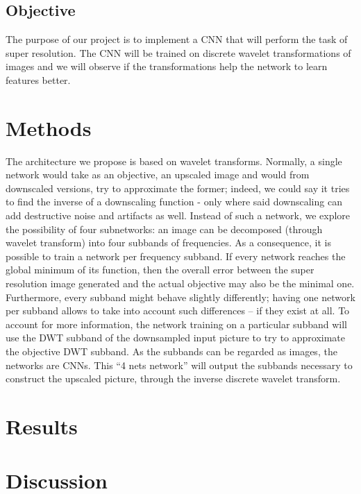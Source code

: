 \documentclass[letterpaper,twocolumn,fleqn]{article}
\begin{document}
\subsection{Objective}

The purpose of our project is to implement a CNN that will perform the task of super resolution. The
CNN will be trained on discrete wavelet transformations of images and we will observe if the
transformations help the network to learn features better. 



\section{Methods}

The architecture we propose is based on wavelet transforms. Normally, a single network would take as
an objective, an upscaled image and would from downscaled versions, try to approximate the former;
indeed, we could say it tries to find the inverse of a downscaling function - only where said downscaling
can add destructive noise and artifacts as well.
Instead of such a network, we explore the possibility of four subnetworks: an image can be decomposed
(through wavelet transform) into four subbands of frequencies. As a consequence, it is possible to train
a network per frequency subband. If every network reaches the global minimum of its function, then the
overall error between the super resolution image generated and the actual objective may also be the
minimal one. Furthermore, every subband might behave slightly differently; having one network per
subband allows to take into account such differences -- if they exist at all.
To account for more information, the network training on a particular subband will use the DWT
subband of the downsampled input picture to try to approximate the objective DWT subband. As the
subbands can be regarded as images, the networks are CNNs.
This “4 nets network” will output the subbands necessary to construct the upscaled picture, through the
inverse discrete wavelet transform. 


\section{Results}


\section{Discussion}


\end{document}
